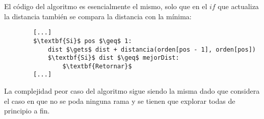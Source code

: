     El código del algoritmo es esencialmente el mismo, solo que en el $if$ que actualiza la distancia también se compara la distancia con la mínima:

    \begin{lstlisting}
        [...]
        $\textbf{Si}$ pos $\geq$ 1:
            dist $\gets$ dist + distancia(orden[pos - 1], orden[pos])
            $\textbf{Si}$ dist $\geq$ mejorDist:
                $\textbf{Retornar}$
        [...]
    \end{lstlisting}

    La complejidad peor caso del algoritmo sigue siendo la misma dado que considera el caso en que no se poda ninguna rama y se tienen que explorar todas de principio a fin.
